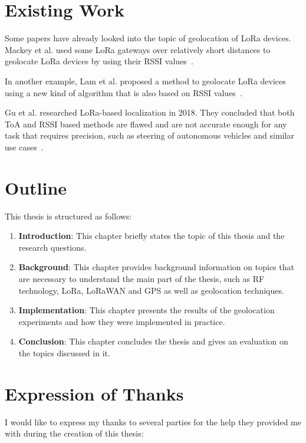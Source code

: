 \section{Existing Work}

Some papers have already looked into the topic of geolocation of \ac{LoRa} devices.
Mackey et al. used some \ac{LoRa} gateways over relatively short distances to geolocate \ac{LoRa} devices by using their \ac{RSSI} values~\cite{mackey_lora-based_2019}.

In another example, Lam et al. proposed a method to geolocate \ac{LoRa} devices using a new kind of algorithm that is also based on \ac{RSSI} values~\cite{lam_new_2018}.

Gu et al. researched \ac{LoRa}-based localization in 2018.
They concluded that both \ac{ToA} and \ac{RSSI} based methods are flawed and are not accurate enough for any task that requires precision, such as steering of autonomous vehicles and similar use cases~\cite{gu_lora-based_2018}.

\section{Outline}

This thesis is structured as follows:

\begin{enumerate}
      \item \textbf{Introduction}:
            This chapter briefly states the topic of this thesis and the research questions.
      \item \textbf{Background}:
            This chapter provides background information on topics that are necessary to understand the main part of the thesis, such as \ac{RF} technology, \ac{LoRa}, \ac{LoRaWAN} and \ac{GPS} as well as geolocation techniques.
      \item \textbf{Implementation}:
            This chapter presents the results of the geolocation experiments and how they were implemented in practice.
      \item \textbf{Conclusion}:
            This chapter concludes the thesis and gives an evaluation on the topics discussed in it.
\end{enumerate}

\section{Expression of Thanks}

I would like to express my thanks to several parties for the help they provided me with during the creation of this thesis:


